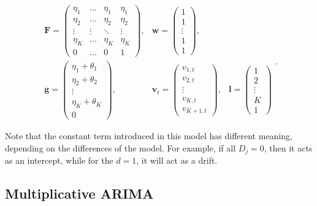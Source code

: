 \documentclass[
]{book}
\theoremstyle{definition}
\theoremstyle{definition}
\theoremstyle{definition}
\theoremstyle{definition}
\theoremstyle{remark}
\begin{document}
\begin{equation}
  \begin{aligned}
    \mathbf{F} = \begin{pmatrix} \eta_1 & \dots & \eta_1 & \eta_1 \\ \eta_2 & \dots & \eta_2 & \eta_2 \\ \vdots & \vdots & \ddots & \vdots \\ \eta_K & \dots & \eta_K & \eta_K \\ 0 & \dots & 0 & 1 \end{pmatrix}, & \mathbf{w} = \begin{pmatrix} 1 \\ 1 \\ \vdots \\ 1 \\ 1 \end{pmatrix}, \\
    \mathbf{g} = \begin{pmatrix} \eta_1 + \theta_1 \\ \eta_2 + \theta_2 \\ \vdots \\ \eta_K + \theta_K \\ 0 \end{pmatrix}, & \mathbf{v}_{t} = \begin{pmatrix} v_{1,t} \\ v_{2,t} \\ \vdots \\ v_{K,t} \\ v_{K+1,t} \end{pmatrix}, & \boldsymbol{l} = \begin{pmatrix} 1 \\ 2 \\ \vdots \\ K \\ 1 \end{pmatrix}
  \end{aligned}.
  \label{eq:ADAMARIMAMatricesConstant}
\end{equation}

Note that the constant term introduced in this model has different meaning, depending on the differences of the model. For example, if all \(D_j=0\), then it acts as an intercept, while for the \(d=1\), it will act as a drift.

\hypertarget{ADAMARIMAPureMultiplicative}{%
\subsection{Multiplicative ARIMA}\label{ADAMARIMAPureMultiplicative}}
\end{document}
